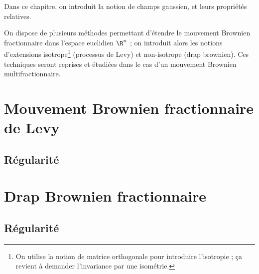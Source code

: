 
Dans ce chapitre, on introduit la notion de champs gaussien, et leurs
propriétés relatives.

On dispose de plusieurs méthodes permettant d'étendre le mouvement
Brownien fractionnaire dans l'espace euclidien $\R^n$ ; on introduit
alors les notions d'extensions isotrope\footnote{On utilise la notion
de matrice orthogonale pour introduire l'isotropie ; ça revient à
demander l'invariance par une isométrie.} (processus de Levy) et
non-isotrope (drap brownien). Ces techniques seront reprises et
étudiées dans le cas d'un mouvement Brownien multifractionnaire.

\section{Mouvement Brownien fractionnaire de Levy}
\subsection{Régularité}
\section{Drap Brownien fractionnaire}
\subsection{Régularité}